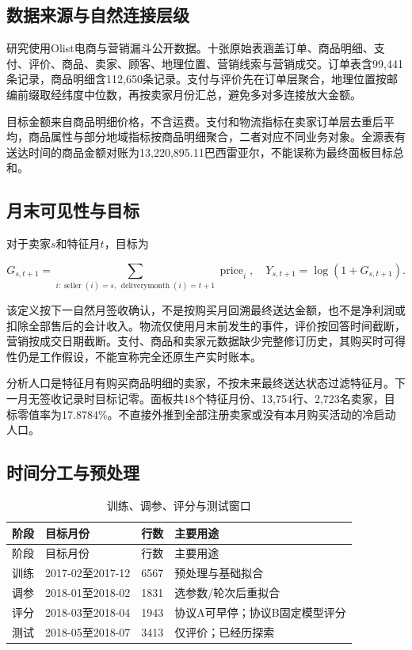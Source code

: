 \documentclass[UTF8,11pt,a4paper]{ctexart}
\begin{document}
\subsection{数据来源与自然连接层级}

研究使用Olist电商与营销漏斗公开数据\cite{olist2018,funnel2018}。十张原始表涵盖订单、商品明细、支付、评价、商品、卖家、顾客、地理位置、营销线索与营销成交。订单表含99,441条记录，商品明细含112,650条记录。支付与评价先在订单层聚合，地理位置按邮编前缀取经纬度中位数，再按卖家月份汇总，避免多对多连接放大金额。

目标金额来自商品明细价格，不含运费。支付和物流指标在卖家订单层去重后平均，商品属性与部分地域指标按商品明细聚合，二者对应不同业务对象。全源表有送达时间的商品金额对账为13,220,895.11巴西雷亚尔，不能误称为最终面板目标总和。

\subsection{月末可见性与目标}

对于卖家\(s\)和特征月\(t\)，目标为

\[
G_{s,t+1}=\sum_{i:\operatorname{seller}(i)=s,\,
\operatorname{deliverymonth}(i)=t+1}\operatorname{price}_i,
\quad Y_{s,t+1}=\log(1+G_{s,t+1}).
\]

该定义按下一自然月签收确认，不是按购买月回溯最终送达金额，也不是净利润或扣除全部售后的会计收入。物流仅使用月末前发生的事件，评价按回答时间截断，营销按成交日期截断。支付、商品和卖家元数据缺少完整修订历史，其购买时可得性仍是工作假设，不能宣称完全还原生产实时账本。

分析人口是特征月有购买商品明细的卖家，不按未来最终送达状态过滤特征月。下一月无签收记录时目标记零。面板共18个特征月份、13,754行、2,723名卖家，目标零值率为17.8784\%。不直接外推到全部注册卖家或没有本月购买活动的冷启动人口。

\subsection{时间分工与预处理}

{
\footnotesize
\begin{longtable}[]{@{}llll@{}}
\caption{训练、调参、评分与测试窗口}\tabularnewline
\toprule\noalign{}
阶段 & 目标月份 & 行数 & 主要用途 \\
\midrule\noalign{}
\endfirsthead
\toprule\noalign{}
阶段 & 目标月份 & 行数 & 主要用途 \\
\midrule\noalign{}
\endhead
\bottomrule\noalign{}
\endlastfoot
训练 & 2017-02至2017-12 & 6567 & 预处理与基础拟合 \\
调参 & 2018-01至2018-02 & 1831 & 选参数/轮次后重拟合 \\
评分 & 2018-03至2018-04 & 1943 & 协议A可早停；协议B固定模型评分 \\
测试 & 2018-05至2018-07 & 3413 & 仅评价；已经历探索 \\
\end{longtable}
}
\end{document}
